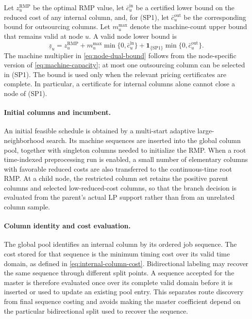 Let $z_u^{\mathrm{RMP}}$ be the optimal RMP value, let
$\bar c_u^{\mathrm{in}}$ be a certified lower bound on the reduced cost of any
internal column, and, for \textup{(SP1)}, let
$\bar c_u^{\mathrm{out}}$ be the corresponding bound for outsourcing columns. Let
$m_u^{\max}$ denote the machine-count upper bound that remains valid at node $u$. A
valid node lower bound is
\begin{equation}
    \underline z_u
    =
    z_u^{\mathrm{RMP}}
    +
    m_u^{\max}\min\{0,\bar c_u^{\mathrm{in}}\}
    +
    \mathbf 1_{\{\mathrm{SP1}\}}
    \min\{0,\bar c_u^{\mathrm{out}}\}.
    \label{eq:node-dual-bound}
\end{equation}
The machine multiplier in \eqref{eq:node-dual-bound} follows from the node-specific
version of \eqref{eq:machine-capacity}; at most one outsourcing column can be
selected in \textup{(SP1)}. The bound is used only when the relevant pricing
certificates are complete. In particular, a certificate for internal columns alone
cannot close a node of \textup{(SP1)}.

\paragraph{Initial columns and incumbent.}
An initial feasible schedule is obtained by a multi-start adaptive
large-neighborhood search. Its machine sequences are inserted into the global
column pool, together with singleton columns needed to initialize the RMP. When a
root time-indexed preprocessing run is enabled, a small number of elementary
columns with favorable reduced costs are also transferred to the continuous-time
root RMP. At a child node, the restricted column set retains the positive parent
columns and selected low-reduced-cost columns, so that the branch decision is
evaluated from the parent's actual LP support rather than from an unrelated column
sample.

\paragraph{Column identity and cost evaluation.}
The global pool identifies an internal column by its ordered job sequence. The cost
stored for that sequence is the minimum timing cost over its valid time domain, as
defined in \eqref{eq:internal-column-cost}. Bidirectional labeling may recover the same
sequence through different split points. A sequence accepted for the master is
therefore evaluated once over its complete valid domain before it is inserted or
used to update an existing pool entry. This separates route discovery from final
sequence costing and avoids making the master coefficient depend on the particular
bidirectional split used to recover the sequence.

